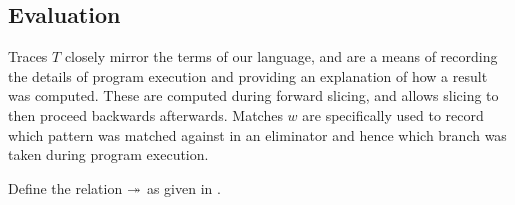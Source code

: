 
\subsection{Evaluation}



Traces $T$ closely mirror the terms of our language, and are a means of recording the details of program execution and providing an explanation of how a result was computed. These are computed during forward slicing, and allows slicing to then proceed backwards afterwards. Matches $w$ are specifically used to record which pattern was matched against in an eliminator and hence which branch was taken during program execution. 





\begin{definition}
   \label{def:core-language:closeDefs}
   Define the relation $\twoheadrightarrow$ as given in .
\end{definition}

